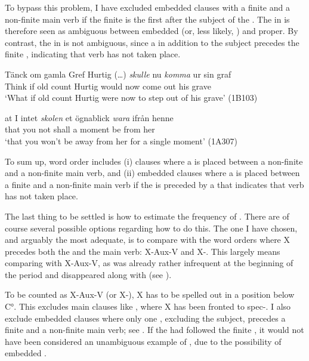 \documentclass[output=paper, colorlinks, citecolor=brown]{langscibook}
\begin{document}
To bypass this problem, I have excluded embedded clauses with a finite  and a non-finite main verb if the finite  is the first  after the subject of the . The  in  is therefore seen as ambiguous between embedded  (or, less likely, ) and  proper. By contrast, the  in  is not ambiguous, since a  in addition to the subject precedes the finite , indicating that verb  has not taken place.


\ea
\label{ex:sangfelt:24}
\ea\label{ex:sangfelt:24a}
\gll Tänck om gamla Gref {Hurtig (…)} \textit{skulle} {nu} \textit{komma} ur sin graf \\ %
 Think if old count Hurtig would now come out his grave\\
\glt ‘What if old count Hurtig were now to step out of his grave’ (1B103)

\ex\label{ex:sangfelt:24b}
\gll at I {intet} \textit{skolen} {et} {ögnablick} \textit{wara} ifrån henne \\
 that you not shall a moment be from her\\
\glt ‘that you won’t be away from her for a single moment’ (1A307)
\z
\z


To sum up,  word order includes (i) clauses where a  is placed between a non-finite  and a non-finite main verb, and (ii) embedded clauses where a  is placed between a finite  and a non-finite main verb if the  is preceded by a  that indicates that verb  has not taken place.


The last thing to be settled is how to estimate the frequency of . There are of course several possible options regarding how to do this. The one I have chosen, and arguably the most adequate, is to compare  with the word orders where X precedes both the  and the main verb: X-Aux-V and X-. This largely means comparing  with X-Aux-V, as  was already rather infrequent at the beginning of the  period and disappeared along with  (see \citealt{Platzack1983,Petzell2011,Sangfelt2019}).



To be counted as X-Aux-V (or X-), X has to be spelled out in a position below C°. This excludes main clauses like , where X has been fronted to spec-. I also exclude embedded clauses where only one , excluding the subject, precedes a finite  and a non-finite main verb; see . If the  had followed the finite , it would not have been considered an unambiguous example of , due to the possibility of embedded .
\end{document}
